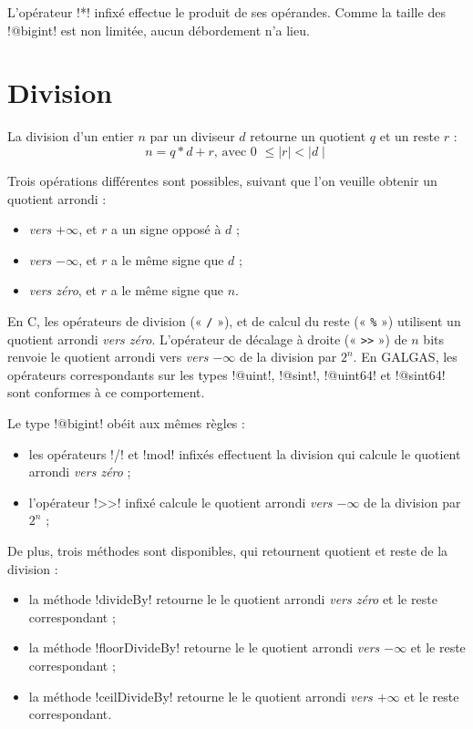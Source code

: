 L'opérateur \ggs!*! infixé effectue le produit de ses opérandes. Comme la taille des \ggs!@bigint! est non limitée, aucun débordement n'a lieu.




\section{Division}



La division d'un entier $n$ par un diviseur $d$ retourne un quotient $q$ et un reste $r$ :
\begin{equation*}
n = q * d + r\text{, avec 0 } \leqslant \mid r\mid < \mid d\mid
\end{equation*}

Trois opérations différentes sont possibles, suivant que l'on veuille obtenir un quotient arrondi :
\begin{itemize}
\item \emph{vers $+\infty$}, et $r$ a un signe opposé à $d$ ;
\item \emph{vers $-\infty$}, et $r$ a le même signe que $d$ ;
\item \emph{vers zéro}, et $r$ a le même signe que $n$.
\end{itemize}

En C, les opérateurs de division (« \texttt{/} »), et de calcul du reste (« \texttt{\%} ») utilisent un quotient arrondi \emph{vers zéro}. L'opérateur de décalage à droite (« \texttt{>{}>} ») de $n$ bits renvoie le quotient arrondi vers \emph{vers $-\infty$} de la division par $2^n$. En GALGAS, les opérateurs correspondants sur les types \ggs!@uint!, \ggs!@sint!, \ggs!@uint64! et \ggs!@sint64! sont conformes à ce comportement.

Le type \ggs!@bigint! obéit aux mêmes règles :
\begin{itemize}
\item les opérateurs \ggs!/! et \ggs!mod! infixés effectuent la division qui calcule le quotient arrondi \emph{vers zéro} ;
  \item l'opérateur \ggs!>>! infixé calcule le quotient arrondi \emph{vers $-\infty$} de la division par $2^n$ ;
\end{itemize}

De plus, trois méthodes sont disponibles, qui retournent quotient et reste de la division :
\begin{itemize}
  \item la méthode \ggs!divideBy! retourne le le quotient arrondi \emph{vers zéro} et le reste correspondant ;
  \item la méthode \ggs!floorDivideBy! retourne le le quotient arrondi \emph{vers $-\infty$} et le reste correspondant ;
  \item la méthode \ggs!ceilDivideBy! retourne le le quotient arrondi \emph{vers $+\infty$} et le reste correspondant.
\end{itemize}


